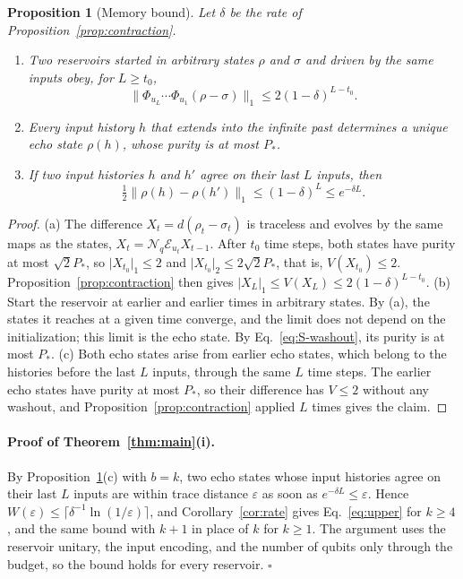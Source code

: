 \documentclass[aps,prl,twocolumn,superscriptaddress,floatfix]{revtex4-2}
\theoremstyle{plain}
\newtheorem{proposition}[lemma]{Proposition}
\newcommand{\nrm}[2]{\lvert #1\rvert_{#2}}
\newcommand{\Norm}[1]{\lVert #1\rVert}
\newcommand{\cE}{\mathcal E}
\newcommand{\Nq}{\mathcal N_q}
\begin{document}
\begin{proposition}[Memory bound]\label{prop:echo}
Let $\delta$ be the rate of Proposition~\ref{prop:contraction}.
\begin{enumerate}
\item[(a)] Two reservoirs started in arbitrary states $\rho$ and $\sigma$ and driven by the same inputs obey, for $L\ge t_0$,
\[
\Norm{\Phi_{u_L}\cdots\Phi_{u_1}(\rho-\sigma)}_1\le2(1-\delta)^{L-t_0}.
\]
\item[(b)] Every input history $h$ that extends into the infinite past determines a unique echo state $\rho(h)$, whose purity is at most $P_*$.
\item[(c)] If two input histories $h$ and $h'$ agree on their last $L$ inputs, then
\[
\tfrac12\Norm{\rho(h)-\rho(h')}_1\le(1-\delta)^L\le e^{-\delta L}.
\]
\end{enumerate}
\end{proposition}

\begin{proof}
(a) The difference $X_t=d(\rho_t-\sigma_t)$ is traceless and evolves by the same maps as the states, $X_t=\Nq\cE_{u_t}X_{t-1}$. After $t_0$ time steps, both states have purity at most $\sqrt2P_*$, so $\nrm{X_{t_0}}1\le2$ and $\nrm{X_{t_0}}2\le2\sqrt2P_*$, that is, $V(X_{t_0})\le2$. Proposition~\ref{prop:contraction} then gives $\nrm{X_L}1\le V(X_L)\le2(1-\delta)^{L-t_0}$.
(b) Start the reservoir at earlier and earlier times in arbitrary states. By (a), the states it reaches at a given time converge, and the limit does not depend on the initialization; this limit is the echo state. By Eq.~\eqref{eq:S-washout}, its purity is at most $P_*$.
(c) Both echo states arise from earlier echo states, which belong to the histories before the last $L$ inputs, through the same $L$ time steps. The earlier echo states have purity at most $P_*$, so their difference has $V\le2$ without any washout, and Proposition~\ref{prop:contraction} applied $L$ times gives the claim.
\end{proof}

\paragraph*{Proof of Theorem~\ref{thm:main}(i).} By Proposition~\ref{prop:echo}(c) with $b=k$, two echo states whose input histories agree on their last $L$ inputs are within trace distance $\varepsilon$ as soon as $e^{-\delta L}\le\varepsilon$. Hence $W(\varepsilon)\le\lceil\delta^{-1}\ln(1/\varepsilon)\rceil$, and Corollary~\ref{cor:rate} gives Eq.~\eqref{eq:upper} for $k\ge4$, and the same bound with $k+1$ in place of $k$ for $k\ge1$. The argument uses the reservoir unitary, the input encoding, and the number of qubits only through the budget, so the bound holds for every reservoir. \hfill$\square$
\end{document}
